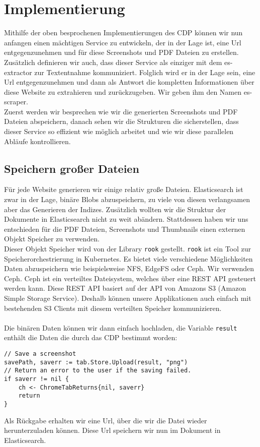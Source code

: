\pagebreak
\section{Implementierung} \label{scraper:sec:implementation}
Mithilfe der oben besprochenen Implementierungen des CDP können wir nun anfangen einen mächtigen Service zu entwickeln, der in der Lage ist, eine Url entgegenzunehmen und für diese Screenshots und PDF Dateien zu erstellen. Zusätzlich definieren wir auch, dass dieser Service als einziger mit dem es-extractor zur Textentnahme kommuniziert. Folglich wird er in der Lage sein, eine Url entgegenzunehmen und dann als Antwort die kompletten Informationen über diese Website zu extrahieren und zurückzugeben. Wir geben ihm den Namen es-scraper. \\
Zuerst werden wir besprechen wie wir die generierten Screenshots und PDF Dateien abspeichern, danach sehen wir die Strukturen die sicherstellen, dass dieser Service so effizient wie möglich arbeitet und wie wir diese parallelen Abläufe kontrollieren.
\subsection{Speichern großer Dateien} \label{scraper:subsec:s3}
Für jede Website generieren wir einige relativ große Dateien. Elasticsearch ist zwar in der Lage, binäre Blobs abzuspeichern, zu viele von diesen verlangsamen aber das Generieren der Indizes. Zusätzlich wollten wir die Struktur der Dokumente in Elasticsearch nicht zu weit abändern. Stattdessen haben wir uns entschieden für die PDF Dateien, Screenshots und Thumbnails einen externen Objekt Speicher zu verwenden. \\
Dieser Objekt Speicher wird von der Library \verb|rook| gestellt. \verb|rook| ist ein Tool zur Speicherorchestrierung in Kubernetes. Es bietet viele verschiedene Möglichkeiten Daten abzuspeichern wie beispielsweise NFS, EdgeFS oder Ceph. Wir verwenden Ceph. Ceph ist ein verteiltes Dateisystem, welches über eine REST API gesteuert werden kann. Diese REST API basiert auf der API von Amazons S3 (Amazon Simple Storage Service). Deshalb können unsere Applikationen auch einfach mit bestehenden S3 Clients mit diesem verteilten Speicher kommunizieren. \\ \\
Die binären Daten können wir dann einfach hochladen, die Variable \verb|result| enthält die Daten die durch das CDP bestimmt worden:
\begin{verbatim}
// Save a screenshot
savePath, saverr := tab.Store.Upload(result, "png")
// Return an error to the user if the saving failed.
if saverr != nil { 
	ch <- ChromeTabReturns{nil, saverr}
	return
}
\end{verbatim}
Als Rückgabe erhalten wir eine Url, über die wir die Datei wieder herunterzuladen können. Diese Url speichern wir nun im Dokument in Elasticsearch.


